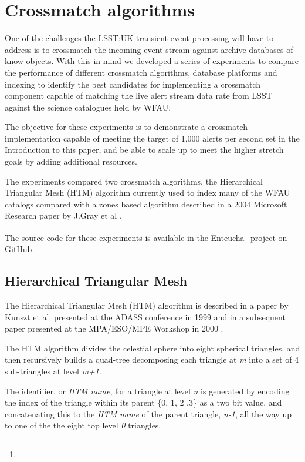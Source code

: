 \documentclass{article}
\newcommand{\enteucha} {Enteucha\xspace}
\newcommand{\github} {GitHub\xspace}
\newcommand{\crossmatch} {crossmatch\xspace}
\newcommand{\lsst} {LSST\xspace}
\newcommand{\lsstuk} {LSST:UK\xspace}
\newcommand{\wfau} {WFAU\xspace}
\newcommand{\footurl}[1] {\footnote{\burl{#1}}}
\begin{document}
\section{Crossmatch algorithms}
\label{crossmatch-algorithms}

One of the challenges the \lsstuk transient event processing will have to address is to \crossmatch the incoming event stream against archive databases of know objects. With this in mind we developed a series of experiments to compare the performance of different \crossmatch algorithms, database platforms and indexing to identify the best candidates for implementing a \crossmatch component capable of matching the live alert stream data rate from \lsst against the science catalogues held by \wfau.

The objective for these experiments is to demonstrate a \crossmatch implementation capable of meeting the target of 1,000 alerts per second set in the Introduction to this paper, and be able to scale up to meet the higher stretch goals by adding additional resources.

The experiments compared two \crossmatch algorithms, the Hierarchical Triangular Mesh (HTM)
algorithm currently used to index many of the \wfau catalogs compared with a zones based algorithm described in a 2004 Microsoft Research paper by J.Gray et al \cite{Gray-2004}.

The source code for these experiments is available in the \enteucha \footurl{https://github.com/lsst-uk/enteucha} project on \github.

\subsection{Hierarchical Triangular Mesh}
\label{crossmatch.htm}

The Hierarchical Triangular Mesh (HTM) algorithm is described in a paper by Kunszt et al. presented at the ADASS conference in 1999 \cite{Kunszt-1999} and in a subsequent paper presented at the MPA/ESO/MPE Workshop in 2000 \cite{Kunszt-2000}.

The HTM algorithm divides the celestial sphere into eight spherical triangles, and then recursively builds a quad-tree decomposing each triangle at \textit{m} into a set of 4 sub-triangles at level \textit{m+1}.

The identifier, or \textit{HTM name}, for a triangle at level \textit{n} is generated by encoding the index of the triangle within its parent \{0, 1, 2 ,3\}  as a two bit value, and concatenating this to the \textit{HTM name} of the parent triangle, \textit{n-1}, all the way up to one of the the eight top level \textit{0} triangles.
\end{document}

